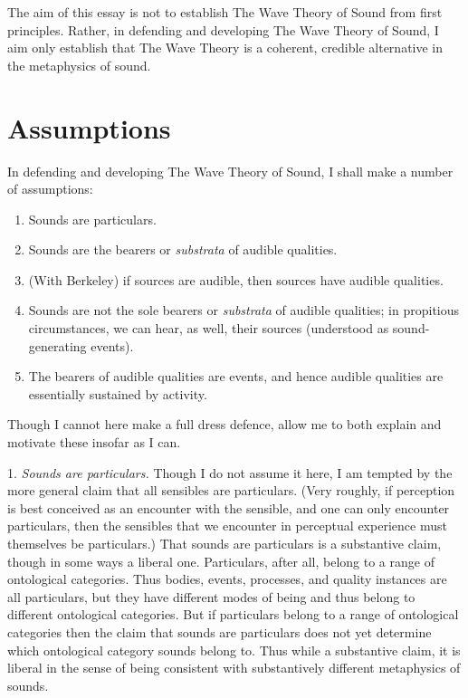 \documentclass[12pt]{article}
\begin{document}
The aim of this essay is not to establish The Wave Theory of Sound from first principles. Rather, in defending and developing The Wave Theory of Sound, I aim only establish that The Wave Theory is a coherent, credible alternative in the metaphysics of sound. 


\section{Assumptions} %
\label{sec:section_name}

In defending and developing The Wave Theory of Sound, I shall make a number of assumptions:
\begin{enumerate}
	\item Sounds are particulars.
	\item Sounds are the bearers or \emph{substrata} of audible qualities.
	\item (With Berkeley) if sources are audible, then sources have audible qualities.
	\item Sounds are not the sole bearers or \emph{substrata} of audible qualities; in propitious circumstances, we can hear, as well, their sources (understood as sound-generating events).
	\item The bearers of audible qualities are events, and hence audible qualities are essentially sustained by activity.
\end{enumerate}
Though I cannot here make a full dress defence, allow me to both explain and motivate these insofar as I can.

1. \emph{Sounds are particulars.} Though I do not assume it here, I am tempted by the more general claim that all sensibles are particulars. (Very roughly, if perception is best conceived as an encounter with the sensible, and one can only encounter particulars, then the sensibles that we encounter in perceptual experience must themselves be particulars.) That sounds are particulars is a substantive claim, though in some ways a liberal one. Particulars, after all, belong to a range of ontological categories. Thus bodies, events, processes, and quality instances are all particulars, but they have different modes of being and thus belong to different ontological categories. But if particulars belong to a range of ontological categories then the claim that sounds are particulars does not yet determine which ontological category sounds belong to. Thus while a substantive claim, it is liberal in the sense of being consistent with substantively different metaphysics of sounds. 
\end{document}
